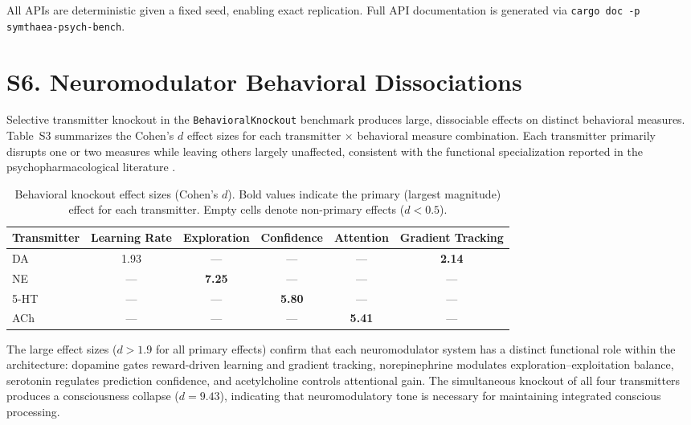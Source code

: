 \documentclass[10pt,landscape]{article}
\begin{document}
\noindent All APIs are deterministic given a fixed seed, enabling exact replication. Full API documentation is generated via \texttt{cargo doc -p symthaea-psych-bench}.


\clearpage
\section*{S6. Neuromodulator Behavioral Dissociations}

Selective transmitter knockout in the \texttt{BehavioralKnockout} benchmark produces large, dissociable effects on distinct behavioral measures. Table~S3 summarizes the Cohen's $d$ effect sizes for each transmitter $\times$ behavioral measure combination. Each transmitter primarily disrupts one or two measures while leaving others largely unaffected, consistent with the functional specialization reported in the psychopharmacological literature \citep{schultz1997dopamine,yerkes1908relation}.

\begin{table}[h]
\centering
\caption{Behavioral knockout effect sizes (Cohen's $d$). Bold values indicate the primary (largest magnitude) effect for each transmitter. Empty cells denote non-primary effects ($d < 0.5$).} \label{tab:s3}
\begin{tabular}{@{}lccccc@{}}
\toprule
\textbf{Transmitter} & \textbf{Learning Rate} & \textbf{Exploration} & \textbf{Confidence} & \textbf{Attention} & \textbf{Gradient Tracking} \\
\midrule
DA  & 1.93 & --- & --- & --- & \textbf{2.14} \\
NE  & --- & \textbf{7.25} & --- & --- & --- \\
5-HT & --- & --- & \textbf{5.80} & --- & --- \\
ACh & --- & --- & --- & \textbf{5.41} & --- \\
\bottomrule
\end{tabular}
\end{table}

\noindent The large effect sizes ($d > 1.9$ for all primary effects) confirm that each neuromodulator system has a distinct functional role within the architecture: dopamine gates reward-driven learning and gradient tracking, norepinephrine modulates exploration--exploitation balance, serotonin regulates prediction confidence, and acetylcholine controls attentional gain. The simultaneous knockout of all four transmitters produces a consciousness collapse ($d = 9.43$), indicating that neuromodulatory tone is necessary for maintaining integrated conscious processing.
\end{document}
